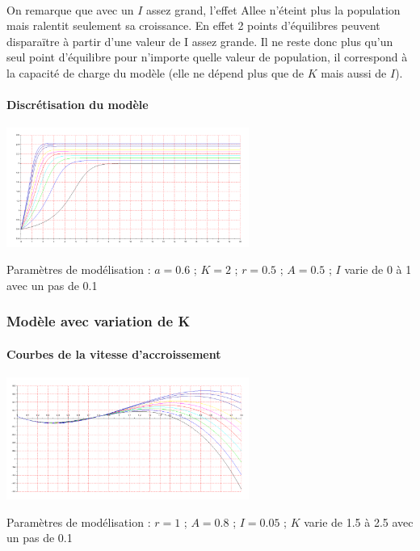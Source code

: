 \documentclass{article}
\begin{document}
\paragraph{}
On remarque que avec un $I$ assez grand, l'effet Allee n'éteint plus la population mais ralentit seulement sa croissance. En effet 2 points d'équilibres peuvent disparaïtre à partir d'une valeur de I assez grande. Il ne reste donc plus qu'un seul point d'équilibre pour n'importe quelle valeur de population, il correspond à la capacité de charge du modèle (elle ne dépend plus que de $K$ mais aussi de $I$).
\newpage

\paragraph{Discrétisation du modèle}
\begin{center}
\includegraphics[width=300px]{img/part1/TrajI.png}
\end{center}
Paramètres de modélisation : $a=0.6$ ; $K=2$  ; $r=0.5$ ; $A=0.5$ ; $I$ varie de 0 à 1 avec un pas de 0.1
\paragraph{}

\subsubsection{Modèle avec variation de K}

\paragraph{Courbes de la vitesse d'accroissement}
\begin{center}
\includegraphics[width=300px]{img/part1/AlleeK.png}
\end{center}
Paramètres de modélisation : $r=1$ ; $A=0.8$ ; $I=0.05$ ; $K$ varie de 1.5 à 2.5 avec un pas de 0.1
\end{document}
